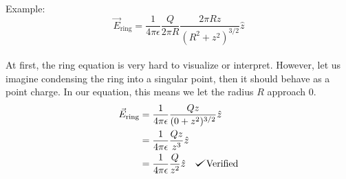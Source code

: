 \documentclass{article}
\def\checkmark{\tikz\fill[scale=0.4](0,.35) -- (.25,0) -- (1,.7) -- (.25,.15) -- cycle;}
\begin{document}
\\
Example:
\begin{equation*}
	\vec{E}_{\text{ring}} = \frac{1}{4\pi\epsilon}\frac{Q}{2\pi R}\frac{2\pi R z}{(R^2 + z^2)^{3/2}}\hat{z}
\end{equation*}\\
At first, the ring equation is very hard to visualize or interpret. However, let us imagine condensing the ring into a singular point, then it should behave as a point charge. In our equation, this means we let the radius $R$ approach $0$.\\
\begin{align*}
	\vec{E}_{\text{ring}} &= \frac{1}{4\pi\epsilon}\frac{Qz}{(0 + z^2)^{3/2}}\hat{z}\\
	&= \frac{1}{4\pi\epsilon}\frac{Qz}{z^3}\hat{z}\\
	&= \frac{1}{4\pi\epsilon}\frac{Q}{z^2}\hat{z} \ \ \ \checkmark \text{Verified}
\end{align*}

\pagebreak
\end{document}
